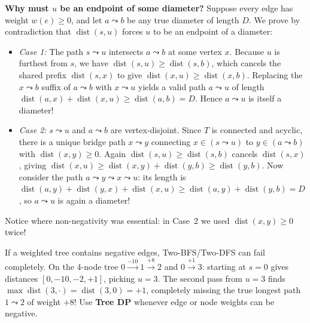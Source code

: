 \documentclass[11pt,a4paper]{article}
\theoremstyle{definition}
\begin{document}
\textbf{Why must $u$ be an endpoint of some diameter?} Suppose every edge has weight $w(e) \ge 0$, and let $a \leadsto b$ be any true diameter of length $D$. We prove by contradiction that $\operatorname{dist}(s, u)$ forces $u$ to be an endpoint of a diameter:
\begin{itemize}
    \item \emph{Case 1:} The path $s \leadsto u$ intersects $a \leadsto b$ at some vertex $x$. Because $u$ is furthest from $s$, we have $\operatorname{dist}(s, u) \ge \operatorname{dist}(s, b)$, which cancels the shared prefix $\operatorname{dist}(s, x)$ to give $\operatorname{dist}(x, u) \ge \operatorname{dist}(x, b)$. Replacing the $x \leadsto b$ suffix of $a \leadsto b$ with $x \leadsto u$ yields a valid path $a \leadsto u$ of length $\operatorname{dist}(a, x) + \operatorname{dist}(x, u) \ge \operatorname{dist}(a, b) = D$. Hence $a \leadsto u$ is itself a diameter!
    \item \emph{Case 2:} $s \leadsto u$ and $a \leadsto b$ are vertex-disjoint. Since $T$ is connected and acyclic, there is a unique bridge path $x \leadsto y$ connecting $x \in (s \leadsto u)$ to $y \in (a \leadsto b)$ with $\operatorname{dist}(x, y) \ge 0$. Again $\operatorname{dist}(s, u) \ge \operatorname{dist}(s, b)$ cancels $\operatorname{dist}(s, x)$, giving $\operatorname{dist}(x, u) \ge \operatorname{dist}(x, y) + \operatorname{dist}(y, b) \ge \operatorname{dist}(y, b)$. Now consider the path $a \leadsto y \leadsto x \leadsto u$: its length is $\operatorname{dist}(a, y) + \operatorname{dist}(y, x) + \operatorname{dist}(x, u) \ge \operatorname{dist}(a, y) + \operatorname{dist}(y, b) = D$, so $a \leadsto u$ is again a diameter!
\end{itemize}
Notice where non-negativity was essential: in Case~2 we used $\operatorname{dist}(x, y) \ge 0$ twice!

\begin{watchoutbox}
If a weighted tree contains negative edges, Two-BFS/Two-DFS can fail completely. On the 4-node tree $0 \xrightarrow{-10} 1 \xrightarrow{+8} 2$ and $0 \xrightarrow{+1} 3$: starting at $s = 0$ gives distances $[0, -10, -2, +1]$, picking $u = 3$. The second pass from $u = 3$ finds $\max \operatorname{dist}(3, \cdot) = \operatorname{dist}(3, 0) = +1$, completely missing the true longest path $1 \leadsto 2$ of weight $+8$! Use \textbf{Tree DP} whenever edge or node weights can be negative.
\end{watchoutbox}
\end{document}
